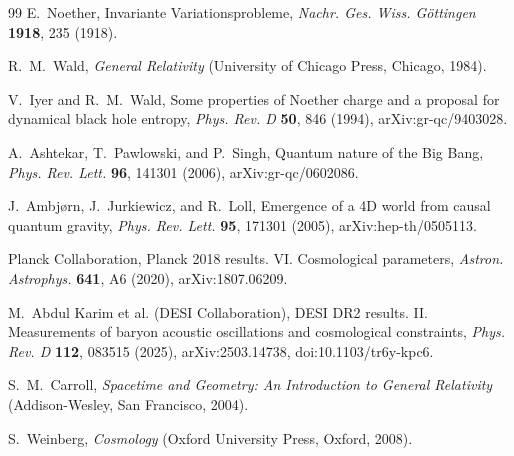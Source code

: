 \documentclass[reprint,aps,prd,letterpaper,superscriptaddress,nofootinbib,longbibliography,floatfix]{revtex4-2}
\theoremstyle{remark}
\begin{document}
\begin{thebibliography}{99}
E.~Noether,
Invariante Variationsprobleme,
\textit{Nachr. Ges. Wiss. G\"ottingen} \textbf{1918}, 235 (1918).

R.~M.~Wald,
\textit{General Relativity}
(University of Chicago Press, Chicago, 1984).

V.~Iyer and R.~M.~Wald,
Some properties of Noether charge and a proposal for dynamical black hole entropy,
\textit{Phys. Rev. D} \textbf{50}, 846 (1994),
arXiv:gr-qc/9403028.

A.~Ashtekar, T.~Pawlowski, and P.~Singh,
Quantum nature of the Big Bang,
\textit{Phys. Rev. Lett.} \textbf{96}, 141301 (2006),
arXiv:gr-qc/0602086.

J.~Ambj\o{}rn, J.~Jurkiewicz, and R.~Loll,
Emergence of a 4D world from causal quantum gravity,
\textit{Phys. Rev. Lett.} \textbf{95}, 171301 (2005),
arXiv:hep-th/0505113.

Planck Collaboration,
Planck 2018 results. VI. Cosmological parameters,
\textit{Astron. Astrophys.} \textbf{641}, A6 (2020),
arXiv:1807.06209.

M.~Abdul Karim et al. (DESI Collaboration),
DESI DR2 results. II. Measurements of baryon acoustic oscillations and cosmological constraints,
\textit{Phys. Rev. D} \textbf{112}, 083515 (2025),
arXiv:2503.14738, doi:10.1103/tr6y-kpc6.

S.~M.~Carroll,
\textit{Spacetime and Geometry: An Introduction to General Relativity}
(Addison-Wesley, San Francisco, 2004).

S.~Weinberg,
\textit{Cosmology}
(Oxford University Press, Oxford, 2008).

\end{thebibliography}
\end{document}

